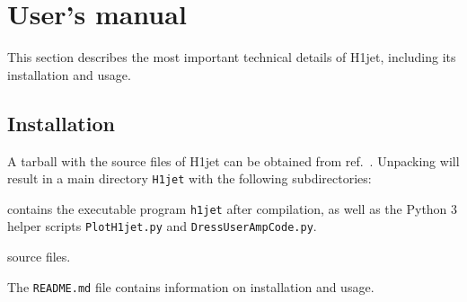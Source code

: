 \documentclass[12pt,a4wide]{article}
\begin{document}
\fi

\section{User's manual} \label{sec:manual} 

This section describes the most important technical details of H1jet, including its installation and usage. 

\subsection{Installation} 
A tarball with the source files of H1jet can be obtained from ref.\ \cite{bib:h1jet}. Unpacking will result in a main directory \texttt{H1jet} with the following subdirectories: 
\begin{description}[labelindent=\parindent, labelwidth =\widthof{\bfseries9999}, leftmargin = !]
	\item[\texttt{bin} :] contains the executable program \texttt{h1jet} after compilation, as well as the Python 3 helper scripts \texttt{PlotH1jet.py} and \texttt{DressUserAmpCode.py}. 
	\item[\texttt{src} :] source files. 
\end{description}
The \texttt{README.md} file contains information on installation and usage. \\
\end{document}

